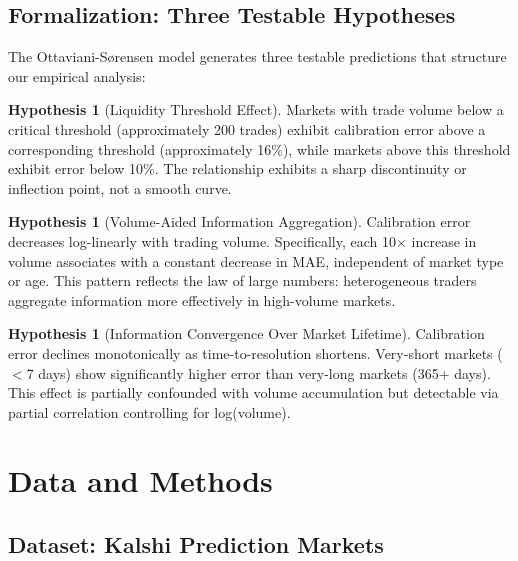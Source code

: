 \documentclass[a4paper,11pt]{article}
\theoremstyle{plain}
\theoremstyle{definition}
\newtheorem{hypothesis}[theorem]{Hypothesis}
\theoremstyle{remark}
\begin{document}
\subsection{Formalization: Three Testable Hypotheses}
\label{subsec:hypotheses}

The Ottaviani-Sørensen model generates three testable predictions that structure our empirical analysis:

\begin{hypothesis}[Liquidity Threshold Effect]
\label{hyp:threshold}
Markets with trade volume below a critical threshold (approximately 200 trades) exhibit calibration error above a corresponding threshold (approximately 16\%), while markets above this threshold exhibit error below 10\%. The relationship exhibits a sharp discontinuity or inflection point, not a smooth curve.
\end{hypothesis}

\begin{hypothesis}[Volume-Aided Information Aggregation]
\label{hyp:volume}
Calibration error decreases log-linearly with trading volume. Specifically, each 10$\times$ increase in volume associates with a constant decrease in MAE, independent of market type or age. This pattern reflects the law of large numbers: heterogeneous traders aggregate information more effectively in high-volume markets.
\end{hypothesis}

\begin{hypothesis}[Information Convergence Over Market Lifetime]
\label{hyp:age}
Calibration error declines monotonically as time-to-resolution shortens. Very-short markets ($<$7 days) show significantly higher error than very-long markets (365+ days). This effect is partially confounded with volume accumulation but detectable via partial correlation controlling for log(volume).
\end{hypothesis}


\section{Data and Methods}
\label{sec:data}

\subsection{Dataset: Kalshi Prediction Markets}
\label{subsec:dataset}
\end{document}

